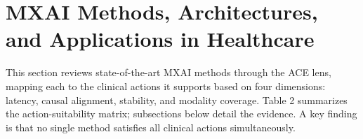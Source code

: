 \documentclass[pdflatex,sn-mathphys-num]{sn-jnl}%
\theoremstyle{thmstyleone}%
\theoremstyle{thmstyletwo}%
\theoremstyle{thmstylethree}%
\begin{document}
\section{MXAI Methods, Architectures, and Applications in Healthcare}


This section reviews state-of-the-art MXAI methods through the ACE lens, mapping each to the clinical actions it supports based on four dimensions: latency, causal alignment, stability, and modality coverage. Table 2 summarizes the action-suitability matrix; subsections below detail the evidence. A key finding is that no single method satisfies all clinical actions simultaneously.
\end{document}
